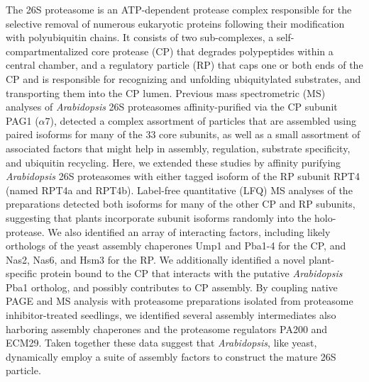 	The 26S proteasome is an ATP-dependent protease complex responsible for the selective removal of numerous eukaryotic proteins following their modification with polyubiquitin chains.  It consists of two sub-complexes, a self-compartmentalized core protease (CP) that degrades polypeptides within a central chamber, and a regulatory particle (RP) that caps one or both ends of the CP and is responsible for recognizing and unfolding ubiquitylated substrates, and transporting them into the CP lumen.  Previous mass spectrometric (MS) analyses of \textit{Arabidopsis} 26S proteasomes affinity-purified via the CP subunit PAG1 ($\alpha$7), detected a complex assortment of particles that are assembled using paired isoforms for many of the 33 core subunits, as well as a small assortment of associated factors that might help in assembly, regulation, substrate specificity, and ubiquitin recycling.  Here, we extended these studies by affinity purifying \textit{Arabidopsis} 26S proteasomes with either tagged isoform of the RP subunit RPT4 (named RPT4a and RPT4b).  Label-free quantitative (LFQ) MS analyses of the preparations detected both isoforms for many of the other CP and RP subunits, suggesting that plants incorporate subunit isoforms randomly into the holo-protease.  We also identified an array of interacting factors, including likely orthologs of the yeast assembly chaperones Ump1 and Pba1-4 for the CP, and Nas2, Nas6, and Hsm3 for the RP.  We additionally identified a novel plant-specific protein bound to the CP that interacts with the putative \textit{Arabidopsis} Pba1 ortholog, and possibly contributes to CP assembly.  By coupling native PAGE and MS analysis with proteasome preparations isolated from proteasome inhibitor-treated seedlings, we identified several assembly intermediates also harboring assembly chaperones and the proteasome regulators PA200 and ECM29.  Taken together these data suggest that \textit{Arabidopsis}, like yeast, dynamically employ a suite of assembly factors to construct the mature 26S particle.
 
